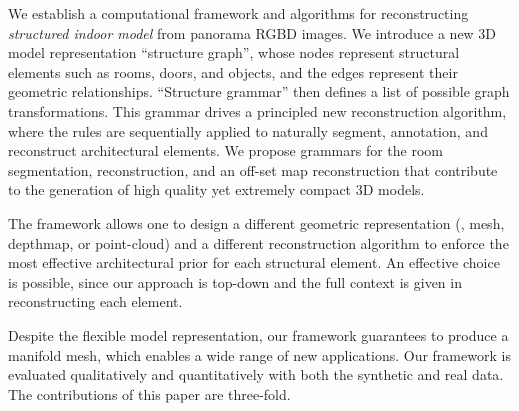 We establish a computational framework and algorithms for reconstructing
{\it structured indoor model} from panorama RGBD images.
We introduce a new 3D model representation ``structure graph'', whose
nodes represent structural elements such as rooms, doors, and objects,
and the edges represent their geometric relationships. ``Structure
grammar'' then defines a list of possible graph transformations. This
grammar drives a principled new reconstruction algorithm, where the
rules are sequentially applied to naturally segment, annotation, and
reconstruct architectural elements. We propose grammars for the room segmentation, reconstruction, and an off-set map reconstruction that contribute to the generation of high quality yet extremely compact 3D models.
 
The framework allows one to design a different geometric representation
(\eg, mesh, depthmap, or point-cloud) and a different reconstruction
algorithm to enforce the most effective architectural prior for each
structural element. An effective choice is possible, since our approach
is top-down and the full context is given in reconstructing each
element. 



Despite the flexible model representation, our framework guarantees to
produce a manifold mesh, which enables a wide range of new
applications. Our framework is evaluated qualitatively and
quantitatively with both the synthetic and real data.
The contributions of this paper are three-fold.
 
